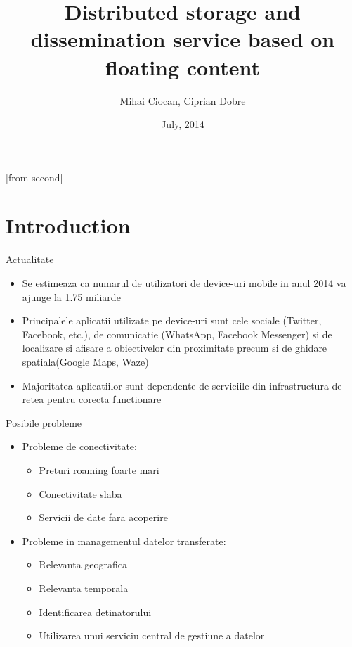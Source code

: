 \documentclass{beamer}
\title[Distributed storage and dissemination service based on floating
content]{Distributed storage and dissemination service based on floating
content}
\institute{Automatic Control and Computers Faculty,\\
	University Politehnica of Bucharest}
\author[Mihai Ciocan, Ciprian Dobre]{Mihai Ciocan, Ciprian Dobre}
\date{July, 2014}
\begin{document}
[from second]


\frame{\titlepage}

\frame{\tableofcontents}

\section{Introduction}

\begin{frame}{Actualitate}
	\begin{itemize}
		\item Se estimeaza ca numarul de utilizatori de device-uri mobile in anul
		2014 va ajunge la 1.75 miliarde
		\item Principalele aplicatii utilizate pe device-uri sunt cele sociale
		(Twitter, Facebook, etc.), de comunicatie (WhatsApp, Facebook Messenger) si de
		localizare si afisare a obiectivelor din proximitate precum si de
		ghidare spatiala(Google Maps, Waze)
		\item Majoritatea aplicatiilor sunt dependente de serviciile din
		infrastructura de retea pentru corecta functionare
	\end{itemize}
\end{frame}

\begin{frame}{Posibile probleme}
	\begin{itemize}
	  \item Probleme de conectivitate:
	  \begin{itemize}
	    \item Preturi roaming foarte mari
	  	\item Conectivitate slaba
	  	\item Servicii de date fara acoperire
	  \end{itemize}
	  \item Probleme in managementul datelor transferate:
	  \begin{itemize}
	    \item Relevanta geografica
	    \item Relevanta temporala
	    \item Identificarea detinatorului
	    \item Utilizarea unui serviciu central de gestiune a datelor
	  \end{itemize}
	\end{itemize}
\end{frame}
\end{document}
